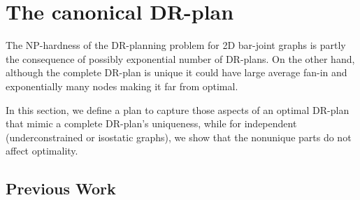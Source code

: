 \section{The canonical DR-plan}
\label{sec:DRP}


The NP-hardness of the DR-planning problem for 2D bar-joint graphs is partly the consequence of possibly exponential number of DR-plans. On the other hand, although the complete DR-plan is unique it could have large average fan-in and exponentially many nodes making it far from optimal.

In this section, we define a  plan to capture those aspects of an optimal DR-plan that mimic a complete DR-plan's uniqueness, while for independent (underconstrained or isostatic graphs), we show that the nonunique parts do not affect optimality.

\subsection{Previous Work}


